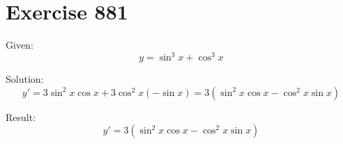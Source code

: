 \documentclass[a4paper, 10pt]{scrartcl}
\begin{document}
\section{Exercise 881}

Given:
\[
y = \sin^{3}{x} + \cos^{3}{x}
\]

Solution:
\[
y' = 3\sin^{2}{x}\cos{x} + 3\cos^{2}{x}(-\sin{x}) = 3(\sin^{2}{x}\cos{x} - \cos^{2}{x}\sin{x})
\]

Result:
\[
y' = 3(\sin^{2}{x}\cos{x} - \cos^{2}{x}\sin{x})
\]
\end{document}
